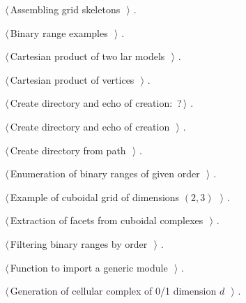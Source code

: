 \documentclass[11pt,oneside]{article}	%
\begin{document}
{\small\begin{list}{}{\setlength{\itemsep}{-\parsep}\setlength{\itemindent}{-\leftmargin}}
\item $\langle\,$Assembling grid skeletons\nobreak\ {\footnotesize {}}$\,\rangle$ {\footnotesize {\NWtxtRefIn} .}
\item $\langle\,$Binary range examples\nobreak\ {\footnotesize {}}$\,\rangle$ {\footnotesize {\NWtxtNoRef}.}
\item $\langle\,$Cartesian product of two lar models\nobreak\ {\footnotesize {}}$\,\rangle$ {\footnotesize {\NWtxtRefIn} .}
\item $\langle\,$Cartesian product of vertices\nobreak\ {\footnotesize {}}$\,\rangle$ {\footnotesize {\NWtxtRefIn} .}
\item $\langle\,$Create directory and echo of creation:\nobreak\ {\footnotesize ?}$\,\rangle$ {\footnotesize {\NWtxtRefIn} .}
\item $\langle\,$Create directory and echo of creation\nobreak\ {\footnotesize {}}$\,\rangle$ {\footnotesize {\NWtxtNoRef}.}
\item $\langle\,$Create directory from path\nobreak\ {\footnotesize {}}$\,\rangle$ {\footnotesize {\NWtxtRefIn} .
}
\item $\langle\,$Enumeration of binary ranges of given order\nobreak\ {\footnotesize {}}$\,\rangle$ {\footnotesize {\NWtxtRefIn} .}
\item $\langle\,$Example of cuboidal grid of dimensions $(2,3)$\nobreak\ {\footnotesize {}}$\,\rangle$ {\footnotesize {\NWtxtNoRef}.}
\item $\langle\,$Extraction of facets from cuboidal complexes\nobreak\ {\footnotesize {}}$\,\rangle$ {\footnotesize {\NWtxtRefIn} .}
\item $\langle\,$Filtering binary ranges by order\nobreak\ {\footnotesize {}}$\,\rangle$ {\footnotesize {\NWtxtRefIn} .}
\item $\langle\,$Function to import a generic module\nobreak\ {\footnotesize {}}$\,\rangle$ {\footnotesize {\NWtxtNoRef}.}
\item $\langle\,$Generation of cellular complex of 0/1 dimension $d$\nobreak\ {\footnotesize {}}$\,\rangle$ {\footnotesize {\NWtxtRefIn} .}

\end{list}}
\end{document}
